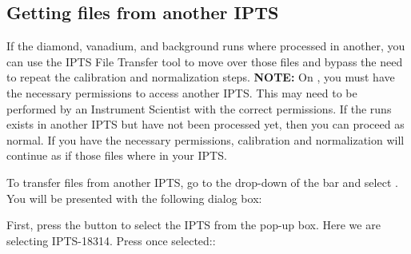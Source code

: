 \subsection{Getting files from another IPTS}

If the diamond, vanadium, and background runs where processed in another, you can use the IPTS File Transfer tool to move over those files and bypass the need to repeat the calibration and normalization steps. \textbf{NOTE:} On \analysis, you must have the necessary permissions to access another IPTS. This may need to be performed by an Instrument Scientist with the correct permissions. If the runs exists in another IPTS but have not been processed yet, then you can proceed as normal. If you have the necessary permissions, calibration and normalization will continue as if those files where in your IPTS.

To transfer files from another IPTS, go to the  drop-down of the  bar and select . You will be presented with the following dialog box:

  \noindent{}
  
First, press the  button to select the IPTS from the pop-up box. Here we are selecting IPTS-18314. Press  once selected::

  \noindent{}
  
